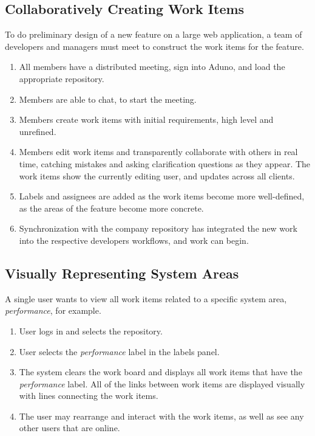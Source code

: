 \documentclass[conference]{IEEEtran}
\begin{document}
\subsection{Collaboratively Creating Work Items}
To do preliminary design of a new feature on a large web application, a team of developers and managers must meet to construct the work items for the feature.  
\begin{enumerate}
	\item All members have a distributed meeting, sign into Aduno, and load the appropriate repository.
	\item Members are able to chat, to start the meeting.  
	\item Members create work items with initial requirements, high level and unrefined.
	\item Members edit work items and transparently collaborate with others in real time, catching mistakes and asking clarification questions as they appear.  The work items show the currently editing user, and updates across all clients. 
	\item Labels and assignees are added as the work items become more well-defined, as the areas of the feature become more concrete.
	\item Synchronization with the company repository has integrated the new work into the respective developers workflows, and work can begin.
\end{enumerate}

\subsection{Visually Representing System Areas}
A single user wants to view all work items related to a specific system area, \textit{performance}, for example. 
\begin{enumerate}
	\item User logs in and selects the repository.
	\item User selects the \textit{performance} label in the labels panel.
	\item The system clears the work board and displays all work items that have the \textit{performance} label.  All of the links between work items are displayed visually with lines connecting the work items.
	\item The user may rearrange and interact with the work items, as well as see any other users that are online.
\end{enumerate}
\end{document}
